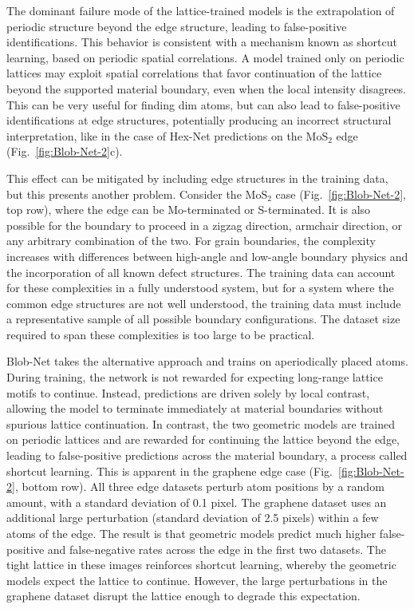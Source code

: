 The dominant failure mode of the lattice-trained models is the extrapolation of periodic structure beyond the edge structure, leading to false-positive identifications. This behavior is consistent with a mechanism known as shortcut learning, based on periodic spatial correlations. A model trained only on periodic lattices may exploit spatial correlations that favor continuation of the lattice beyond the supported material boundary, even when the local intensity disagrees. This can be very useful for finding dim atoms, but can also lead to false-positive identifications at edge structures, potentially producing an incorrect structural interpretation, like in the case of Hex-Net predictions on the $\mathrm{MoS_2}$ edge (Fig.~\ref{fig:Blob-Net-2}c).

This effect can be mitigated by including edge structures in the training data, but this presents another problem. Consider the $\mathrm{MoS_2}$ case (Fig.~\ref{fig:Blob-Net-2}, top row), where the edge can be Mo-terminated or S-terminated. It is also possible for the boundary to proceed in a zigzag direction, armchair direction, or any arbitrary combination of the two. For grain boundaries, the complexity increases with differences between high-angle and low-angle boundary physics and the incorporation of all known defect structures. The training data can account for these complexities in a fully understood system, but for a system where the common edge structures are not well understood, the training data must include a representative sample of all possible boundary configurations. The dataset size required to span these complexities is too large to be practical.

Blob-Net takes the alternative approach and trains on aperiodically placed atoms. During training, the network is not rewarded for expecting long-range lattice motifs to continue. Instead, predictions are driven solely by local contrast, allowing the model to terminate immediately at material boundaries without spurious lattice continuation. In contrast, the two geometric models are trained on periodic lattices and are rewarded for continuing the lattice beyond the edge, leading to false-positive predictions across the material boundary, a process called shortcut learning. This is apparent in the graphene edge case (Fig.~\ref{fig:Blob-Net-2}, bottom row). All three edge datasets perturb atom positions by a random amount, with a standard deviation of 0.1 pixel. The graphene dataset uses an additional large perturbation (standard deviation of 2.5 pixels) within a few atoms of the edge. The result is that geometric models predict much higher false-positive and false-negative rates across the edge in the first two datasets. The tight lattice in these images reinforces shortcut learning, whereby the geometric models expect the lattice to continue. However, the large perturbations in the graphene dataset disrupt the lattice enough to degrade this expectation.

